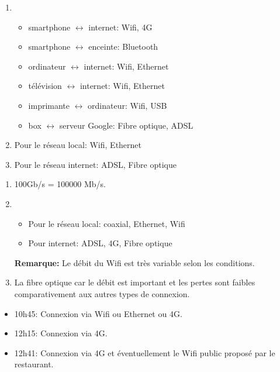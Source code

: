 \documentclass[a4paper,11pt]{article}
\begin{document}
\begin{Form}
\begin{exo}[Activité]
\begin{enumerate}
\item
\begin{itemize}
\item smartphone $\longleftrightarrow$ internet: Wifi, 4G
\item smartphone $\longleftrightarrow$ enceinte: Bluetooth
\item ordinateur $\longleftrightarrow$ internet: Wifi, Ethernet
\item télévision $\longleftrightarrow$ internet: Wifi, Ethernet
\item imprimante $\longleftrightarrow$ ordinateur: Wifi, USB
\item box $\longleftrightarrow$ serveur Google: Fibre optique, ADSL
\end{itemize}
\item Pour le réseau local: Wifi, Ethernet
\item Pour le réseau internet: ADSL, Fibre optique
\end{enumerate}
\end{exo}
\begin{exo}[Activité]
\begin{enumerate}
\item 100Gb/s = 100000 Mb/s.
\item 
\begin{itemize}
\item Pour le réseau local: coaxial, Ethernet, Wifi
\item Pour internet: ADSL, 4G, Fibre optique
\end{itemize}
\textbf{Remarque:} Le débit du Wifi est très variable selon les conditions.
\item La fibre optique car le débit est important et les pertes sont faibles comparativement aux autres types de connexion.
\end{enumerate}
\end{exo}
\begin{exo}[Activité]
\begin{itemize}
\item 10h45: Connexion via Wifi ou Ethernet ou 4G.
\item 12h15: Connexion via 4G.
\item 12h41: Connexion via 4G et éventuellement le Wifi public proposé par le restaurant.
\end{itemize}
\end{exo}

\end{Form}
\end{document}

